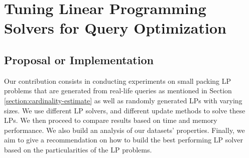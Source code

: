\chapter{Tuning Linear Programming Solvers for Query Optimization}\label{chapter:linearprogramming}

\section{Proposal or Implementation}
Our contribution consists in conducting experiments on small packing LP problems that are generated from
real-life queries as mentioned in Section \ref{section:cardinality-estimate} as well as randomly generated
LPs with varying sizes. We use different LP solvers, and different update methods to solve these LPs.
We then proceed to compare results based on time and memory performance. We also build an analysis of our datasets' properties.
Finally, we aim to give a recommendation on how to build the best performing LP solver based on the
particularities of the LP problems.

